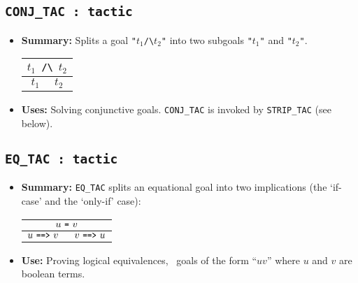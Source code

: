 \subsection{\tt CONJ\_TAC : tactic}\label{CONJTAC}

\begin{itemize}

\item{\bf Summary:} Splits a
goal {\small\verb|"|}$t_1${\small\verb|/\|}$t_2${\small\verb|"|} into two subgoals {\small\verb|"|}$t_1${\small\verb|"|}
and {\small\verb|"|}$t_2${\small\verb|"|}.

\begin{center}
\begin{tabular}{c} \\
$t_1${\small\verb| /\ |}$t_2$
\\ \hline \hline
$t_1\ \ \ \ \ \ t_2$
\\
\end{tabular}
\end{center}

\item{\bf Uses:} Solving conjunctive goals.
{\small\verb|CONJ_TAC|} is invoked by {\small\verb|STRIP_TAC|} (see below).

\end{itemize}



\subsection{\tt EQ\_TAC : tactic}\label{EQTAC}


\begin{itemize}

\item{\bf Summary:}
{\small\verb|EQ_TAC|}
splits an equational goal into two implications (the `if-case' and
the `only-if' case):

\begin{center}



\begin{tabular}{c} \\
$u\ \ml{=}\ v$
\\ \hline \hline
$u\ \ml{==>}\ v\ \ \ \ \ v\ \ml{==>}\ u$
\\
\end{tabular}
\end{center}

\item{\bf Use:} Proving logical equivalences, \ie\ goals of the form
``$u$\ml{=}$v$'' where $u$ and $v$ are boolean terms.

\end{itemize}




